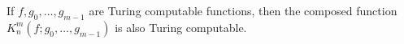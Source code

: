If $f, g_0, \ldots, g_{m-1}$ are Turing computable functions, then the composed function $K_n^m(f; g_0, \ldots, g_{m-1})$ is also Turing computable.
